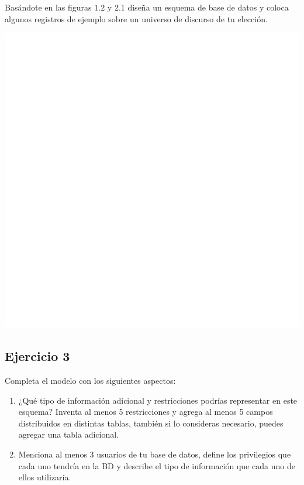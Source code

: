 \documentclass[a4paper,12pt]{article}
\begin{document}
Basándote en las figuras 1.2 y 2.1 diseña un esquema de base de datos y coloca algunos
registros de ejemplo sobre un universo de discurso de tu elección.

\begin{center}
    \includegraphics[scale = .6]{ejercico02.png}
\end{center}

\subsection*{Ejercicio 3}

Completa el modelo con los siguientes aspectos:

\begin{enumerate}
    \item ¿Qué tipo de información adicional y restricciones podrías representar en este
    esquema? Inventa al menos 5 restricciones y agrega al menos 5 campos distribuidos
    en distintas tablas, también si lo consideras necesario, puedes agregar una tabla
    adicional.

    \item Menciona al menos 3 usuarios de tu base de datos, define los privilegios que cada
    uno tendría en la BD y describe el tipo de información que cada uno de ellos
    utilizaría.
\end{enumerate}
\end{document}
